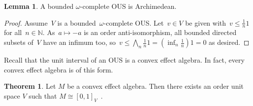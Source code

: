 \documentclass[10pt,conference]{IEEEtran}
\newcommand{\N}{\mathbb{N}}
\newcounter{counter}
\theoremstyle{definition}
\newtheorem{theorem}[counter]{Theorem}
\newtheorem{lemma}[counter]{Lemma}
\begin{document}
\begin{lemma}\label{boundeddircomplisarchous}
    A bounded $\omega$-complete OUS is Archimedean.
\end{lemma}
\begin{proof}
Assume~$V$ is a bounded~$\omega$-complete OUS.
    Let~$v \in V$ be given with~$v \leq \frac1n 1$ for all~$n \in \N$.
As~$a \mapsto -a$ is an order anti-isomorphism,
    all bounded directed subsets of~$V$ have an infimum too,
    so~$v \leq \bigwedge_n \frac1n 1 = (\inf_n \frac{1}{n})1 = 0$
    as desired.
\end{proof}

Recall that the unit interval of an OUS is a convex effect algebra.
In fact, every convex effect algebra is of this form.
\begin{theorem}\label{prop:convextotalisation}
    Let $M$ be a convex effect algebra. Then there exists an order
    unit space $V$ such that $M\cong [0,1]_V$~\cite{gudder1998representation}.
\end{theorem}



\end{document}
